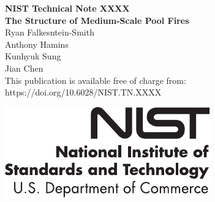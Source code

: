 \documentclass[12pt]{article}
\newcommand{\pubnumber}{XXXX}
\newcommand{\DOI}{https://doi.org/10.6028/NIST.TN.XXXX}
\begin{document}
	
	\begin{titlepage}
		\begin{flushright}
\LARGE{\textbf{NIST Technical Note \pubnumber}}\\
\vfill
\Huge{\textbf{The Structure of Medium-Scale Pool Fires}}\\
\vfill
\large Ryan Falkesntein-Smith\\
\large Anthony Hamins\\
\large Kunhyuk Sung\\
\large Jian Chen\\
\vfill
\normalsize This publication is available free of charge from:\\
\DOI\\
\vfill

\includegraphics[width=0.3\linewidth]{NIST-logo}\\ 


\end{flushright}
\end{titlepage}
\end{document}
